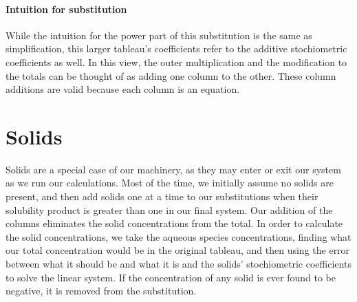 \documentclass{article}
\begin{document}
\paragraph{Intuition for substitution}
While the intuition for the power part of this substitution is the same as simplification, this larger tableau's coefficients refer to the additive stochiometric coefficients as well. In this view, the outer multiplication and the modification to the totals can be thought of as adding one column to the other. These column additions are valid because each column is an equation.

\section{Solids}
Solids are a special case of our machinery, as they may enter or exit our system as we run our calculations. Most of the time, we initially assume no solids are present, and then add solids one at a time to our substitutions when their solubility product is greater than one in our final system. Our addition of the columns eliminates the solid concentrations from the total. In order to calculate the solid concentrations, we take the aqueous species concentrations, finding what our total concentration would be in the original tableau, and then using the error between what it should be and what it is and the solids' stochiometric coefficients to solve the linear system. If the concentration of any solid is ever found to be negative, it is removed from the substitution.
\end{document}
